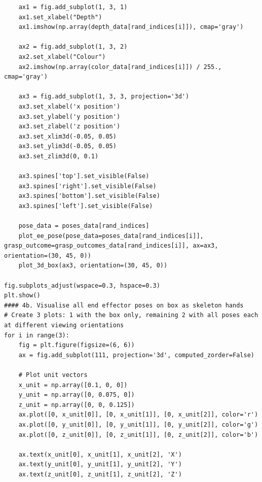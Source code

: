 \documentclass[11pt, a4paper]{report}
\begin{document}
\begin{lstlisting}
    ax1 = fig.add_subplot(1, 3, 1)
    ax1.set_xlabel("Depth")
    ax1.imshow(np.array(depth_data[rand_indices[i]]), cmap='gray')

    ax2 = fig.add_subplot(1, 3, 2)
    ax2.set_xlabel("Colour")
    ax2.imshow(np.array(color_data[rand_indices[i]]) / 255., cmap='gray')
    
    ax3 = fig.add_subplot(1, 3, 3, projection='3d')
    ax3.set_xlabel('x position')
    ax3.set_ylabel('y position')
    ax3.set_zlabel('z position')
    ax3.set_xlim3d(-0.05, 0.05)
    ax3.set_ylim3d(-0.05, 0.05)
    ax3.set_zlim3d(0, 0.1)

    ax3.spines['top'].set_visible(False)
    ax3.spines['right'].set_visible(False)
    ax3.spines['bottom'].set_visible(False)
    ax3.spines['left'].set_visible(False)

    pose_data = poses_data[rand_indices]
    plot_ee_pose(pose_data=poses_data[rand_indices[i]], grasp_outcome=grasp_outcomes_data[rand_indices[i]], ax=ax3, orientation=(30, 45, 0))
    plot_3d_box(ax3, orientation=(30, 45, 0))

fig.subplots_adjust(wspace=0.3, hspace=0.3)
plt.show()
#### 4b. Visualise all end effector poses on box as skeleton hands
# Create 3 plots: 1 with the box only, remaining 2 with all poses each at different viewing orientations
for i in range(3):
    fig = plt.figure(figsize=(6, 6))
    ax = fig.add_subplot(111, projection='3d', computed_zorder=False)
    
    # Plot unit vectors
    x_unit = np.array([0.1, 0, 0])
    y_unit = np.array([0, 0.075, 0])
    z_unit = np.array([0, 0, 0.125])
    ax.plot([0, x_unit[0]], [0, x_unit[1]], [0, x_unit[2]], color='r')
    ax.plot([0, y_unit[0]], [0, y_unit[1]], [0, y_unit[2]], color='g')
    ax.plot([0, z_unit[0]], [0, z_unit[1]], [0, z_unit[2]], color='b')

    ax.text(x_unit[0], x_unit[1], x_unit[2], 'X')
    ax.text(y_unit[0], y_unit[1], y_unit[2], 'Y')
    ax.text(z_unit[0], z_unit[1], z_unit[2], 'Z')


\end{lstlisting}
\end{document}
